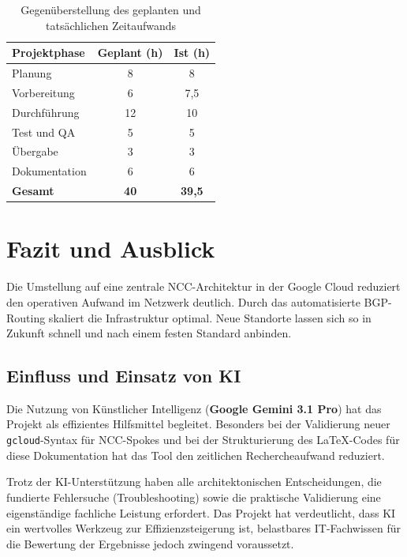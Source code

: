 \begin{table}[!ht]
\centering
\begin{tabular}{|p{}|c|c|}
\hline
\textbf{Projektphase} & \textbf{Geplant (h)} & \textbf{Ist (h)} \\ \hline
Planung & 8 & 8 \\ \hline
Vorbereitung & 6 & 7,5 \\ \hline
Durchführung & 12 & 10 \\ \hline
Test und QA & 5 & 5 \\ \hline
Übergabe & 3 & 3 \\ \hline
Dokumentation & 6 & 6 \\ \hline
\textbf{Gesamt} & \textbf{40} & \textbf{39,5} \\ \hline
\end{tabular}
\caption{Gegenüberstellung des geplanten und tatsächlichen Zeitaufwands}
\end{table}

\section{Fazit und Ausblick}
Die Umstellung auf eine zentrale NCC-Architektur in der Google Cloud reduziert den operativen Aufwand im Netzwerk deutlich. Durch das automatisierte BGP-Routing skaliert die Infrastruktur optimal. Neue Standorte lassen sich so in Zukunft schnell und nach einem festen Standard anbinden.

\subsection*{Einfluss und Einsatz von KI}
Die Nutzung von Künstlicher Intelligenz (\textbf{Google Gemini 3.1 Pro}) hat das Projekt als effizientes Hilfsmittel begleitet. Besonders bei der Validierung neuer \texttt{gcloud}-Syntax für NCC-Spokes und bei der Strukturierung des \LaTeX-Codes für diese Dokumentation hat das Tool den zeitlichen Rechercheaufwand reduziert.

Trotz der KI-Unterstützung haben alle architektonischen Entscheidungen, die fundierte Fehlersuche (Troubleshooting) sowie die praktische Validierung eine eigenständige fachliche Leistung erfordert. Das Projekt hat verdeutlicht, dass KI ein wertvolles Werkzeug zur Effizienzsteigerung ist, belastbares IT-Fachwissen für die Bewertung der Ergebnisse jedoch zwingend voraussetzt.